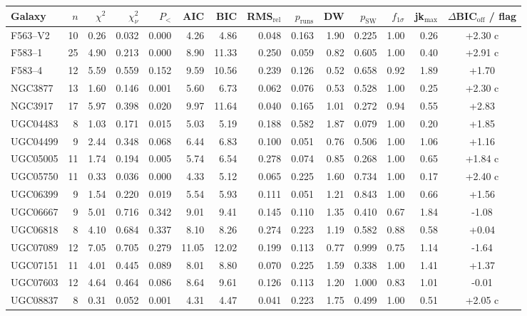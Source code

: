 \documentclass[10pt]{article}
\begin{document}
\begin{landscape}
{\begin{longtable}{lrrrrrrrrrrrrc}
\toprule Galaxy & $n$ & $\chi^2$ & $\chi^2_\nu$ & $P_<$ & AIC & BIC & RMS$_\mathrm{rel}$ & $p_\mathrm{runs}$ & DW & $p_\mathrm{SW}$ & $f_{1\sigma}$ & jk$_\mathrm{max}$ & $\Delta$BIC$_\mathrm{off}$ / flag\\\midrule\endhead\bottomrule\endfoot
F563--V2 & 10 & 0.26 & 0.032 & 0.000 & 4.26 & 4.86 & 0.048 & 0.163 & 1.90 & 0.225 & 1.00 & 0.26 & +2.30 c\\
F583--1 & 25 & 4.90 & 0.213 & 0.000 & 8.90 & 11.33 & 0.250 & 0.059 & 0.82 & 0.605 & 1.00 & 0.40 & +2.91 c\\
F583--4 & 12 & 5.59 & 0.559 & 0.152 & 9.59 & 10.56 & 0.239 & 0.126 & 0.52 & 0.658 & 0.92 & 1.89 & +1.70 \\
NGC3877 & 13 & 1.60 & 0.146 & 0.001 & 5.60 & 6.73 & 0.062 & 0.076 & 0.53 & 0.528 & 1.00 & 0.25 & +2.30 c\\
NGC3917 & 17 & 5.97 & 0.398 & 0.020 & 9.97 & 11.64 & 0.040 & 0.165 & 1.01 & 0.272 & 0.94 & 0.55 & +2.83 \\
UGC04483 & 8 & 1.03 & 0.171 & 0.015 & 5.03 & 5.19 & 0.188 & 0.582 & 1.87 & 0.079 & 1.00 & 0.20 & +1.85 \\
UGC04499 & 9 & 2.44 & 0.348 & 0.068 & 6.44 & 6.83 & 0.100 & 0.051 & 0.76 & 0.506 & 1.00 & 1.06 & +1.16 \\
UGC05005 & 11 & 1.74 & 0.194 & 0.005 & 5.74 & 6.54 & 0.278 & 0.074 & 0.85 & 0.268 & 1.00 & 0.65 & +1.84 c\\
UGC05750 & 11 & 0.33 & 0.036 & 0.000 & 4.33 & 5.12 & 0.065 & 0.225 & 1.60 & 0.734 & 1.00 & 0.17 & +2.40 c\\
UGC06399 & 9 & 1.54 & 0.220 & 0.019 & 5.54 & 5.93 & 0.111 & 0.051 & 1.21 & 0.843 & 1.00 & 0.66 & +1.56 \\
UGC06667 & 9 & 5.01 & 0.716 & 0.342 & 9.01 & 9.41 & 0.145 & 0.110 & 1.35 & 0.410 & 0.67 & 1.84 & -1.08 \\
UGC06818 & 8 & 4.10 & 0.684 & 0.337 & 8.10 & 8.26 & 0.274 & 0.223 & 1.19 & 0.582 & 0.88 & 0.58 & +0.04 \\
UGC07089 & 12 & 7.05 & 0.705 & 0.279 & 11.05 & 12.02 & 0.199 & 0.113 & 0.77 & 0.999 & 0.75 & 1.14 & -1.64 \\
UGC07151 & 11 & 4.01 & 0.445 & 0.089 & 8.01 & 8.80 & 0.070 & 0.225 & 1.59 & 0.338 & 1.00 & 1.41 & +1.37 \\
UGC07603 & 12 & 4.64 & 0.464 & 0.086 & 8.64 & 9.61 & 0.126 & 0.113 & 1.20 & 1.000 & 0.83 & 1.01 & -0.01 \\
UGC08837 & 8 & 0.31 & 0.052 & 0.001 & 4.31 & 4.47 & 0.041 & 0.223 & 1.75 & 0.499 & 1.00 & 0.51 & +2.05 c\\

\end{longtable}}
\end{landscape}
\end{document}
